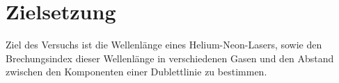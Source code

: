 
\section{Zielsetzung}
\label{sec:Zielsetzung}

Ziel des Versuchs ist die Wellenlänge eines Helium-Neon-Lasers, sowie den Brechungsindex dieser Wellenlänge in verschiedenen Gasen und den Abstand zwischen den Komponenten einer Dublettlinie zu bestimmen.